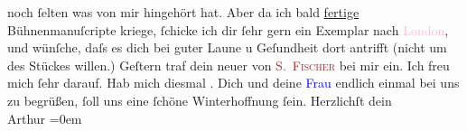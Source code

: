                noch ſelten was von mir hingehört hat. Aber da {\pb}ich bald \uline{fertige} Bühnenmanuſcripte kriege, ſchicke ich  dir ſehr gern ein Exemplar nach \textcolor{pink}{London}{}\ledrightnote{\textcolor{pink}{London}}, und wünſche, daſs es dich bei guter Laune u Geſundheit dort antrifft (nicht um des Stückes willen.)\pend
           \pstart
           Geſtern traf dein neuer \label{K_L01959_1v}\label{K_L01959_1h} von \textsc{\textcolor{brown}{S. Fischer}{}\ledrightnote{\textcolor{brown}{S. Fischer Verlag}}} bei mir ein. Ich freu
               mich ſehr darauf. Hab mich diesmal \label{K_L01959_2v}\label{K_L01959_2h}.\pend
           \pstart
           {\pb}Dich und deine \textcolor{blue}{Frau}{} endlich einmal bei uns zu
               begrüßen, ſoll uns eine ſchöne Winterhoffnung ſein.\pend
           \pstart
           Herzlichſt dein{\\[\baselineskip]}\spacefill\mbox{Arthur}\pend
           \leftskip=0em{}\endnumbering{}  
      